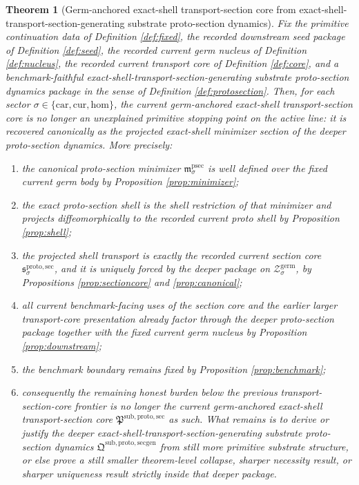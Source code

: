 \documentclass[11pt]{article}
\newcommand{\Car}{\mathrm{car}}
\newcommand{\Cur}{\mathrm{cur}}
\newcommand{\Hom}{\mathrm{hom}}
\newcommand{\GermShell}[1]{\mathcal Z_{#1}^{\mathrm{germ}}}
\newcommand{\ProtoSectionCore}{\mathfrak P^{\mathrm{sub,proto,sec}}}
\newcommand{\ProtoTransportSec}[1]{\mathfrak s_{#1}^{\mathrm{proto,sec}}}
\newcommand{\ProtoSectionPackage}{\mathfrak Q^{\mathrm{sub,proto,secgen}}}
\newcommand{\ProtoSectionMin}[1]{\mathfrak m_{#1}^{\mathrm{psec}}}
\newtheorem{theorem}{Theorem}
\begin{document}
\begin{theorem}[Germ-anchored exact-shell transport-section core from exact-shell-transport-section-generating substrate proto-section dynamics]
\label{thm:main}
Fix the primitive continuation data of Definition \ref{def:fixed}, the recorded downstream seed package of Definition \ref{def:seed}, the recorded current germ nucleus of Definition \ref{def:nucleus}, the recorded current transport core of Definition \ref{def:core}, and a benchmark-faithful exact-shell-transport-section-generating substrate proto-section dynamics package in the sense of Definition \ref{def:protosection}. Then, for each sector \(\sigma\in\{\Car,\Cur,\Hom\}\), the current germ-anchored exact-shell transport-section core is no longer an unexplained primitive stopping point on the active line: it is recovered canonically as the projected exact-shell minimizer section of the deeper proto-section dynamics. More precisely:
\begin{enumerate}
    \item the canonical proto-section minimizer \(\ProtoSectionMin{\sigma}\) is well defined over the fixed current germ body by Proposition \ref{prop:minimizer};
    \item the exact proto-section shell is the shell restriction of that minimizer and projects diffeomorphically to the recorded current proto shell by Proposition \ref{prop:shell};
    \item the projected shell transport is exactly the recorded current section core \(\ProtoTransportSec{\sigma}\), and it is uniquely forced by the deeper package on \(\GermShell{\sigma}\), by Propositions \ref{prop:sectioncore} and \ref{prop:canonical};
    \item all current benchmark-facing uses of the section core and the earlier larger transport-core presentation already factor through the deeper proto-section package together with the fixed current germ nucleus by Proposition \ref{prop:downstream};
    \item the benchmark boundary remains fixed by Proposition \ref{prop:benchmark};
    \item consequently the remaining honest burden below the previous transport-section-core frontier is no longer the current germ-anchored exact-shell transport-section core \(\ProtoSectionCore\) as such. What remains is to derive or justify the deeper exact-shell-transport-section-generating substrate proto-section dynamics \(\ProtoSectionPackage\) from still more primitive substrate structure, or else prove a still smaller theorem-level collapse, sharper necessity result, or sharper uniqueness result strictly inside that deeper package.
\end{enumerate}
\end{theorem}
\end{document}
